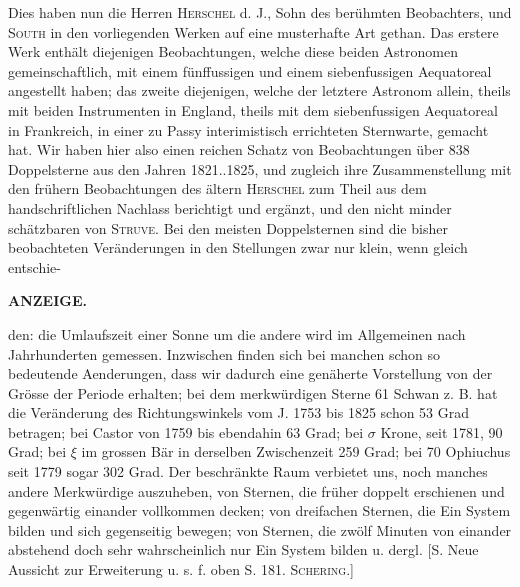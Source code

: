 Dies haben nun die Herren \textsc{Herschel} d. J., Sohn des berühmten Beobachters, und \textsc{South} in den vorliegenden Werken auf eine musterhafte Art gethan. Das erstere Werk enthält diejenigen Beobachtungen, welche diese beiden Astronomen gemeinschaftlich, mit einem fünffussigen und einem siebenfussigen Aequatoreal angestellt haben; das zweite diejenigen, welche der letztere Astronom allein, theils mit beiden Instrumenten in England, theils mit dem siebenfussigen Aequatoreal in Frankreich, in einer zu Passy interimistisch errichteten Sternwarte, gemacht hat. Wir haben hier also einen reichen Schatz von Beobachtungen über 838 Doppelsterne aus den Jahren 1821..1825, und zugleich ihre Zusammenstellung mit den frühern Beobachtungen des ältern \textsc{Herschel} zum Theil aus dem handschriftlichen Nachlass berichtigt und ergänzt, und den nicht minder schätzbaren von \textsc{Struve}. Bei den meisten Doppelsternen sind die bisher beobachteten Veränderungen in den Stellungen zwar nur klein, wenn gleich entschie-
\par\clearpage\thispagestyle{empty}
\fancyhead[L]{}
\noindent{}\parbox[t]{\dimexpr\linewidth-24mm\relax}{\centering\scriptsize\bfseries ANZEIGE.}\makebox[12mm][r]{\large\bfseries }\par\nobreak\medskip\noindent den: die Umlaufszeit einer Sonne um die andere wird im Allgemeinen nach Jahrhunderten gemessen. Inzwischen finden sich bei manchen schon so bedeutende Aenderungen, dass wir dadurch eine genäherte Vorstellung von der Grösse der Periode erhalten; bei dem merkwürdigen Sterne 61 Schwan z. B. hat die Veränderung des Richtungswinkels vom J. 1753 bis 1825 schon 53 Grad betragen; bei Castor von 1759 bis ebendahin 63 Grad; bei $\sigma$ Krone, seit 1781, 90 Grad; bei $\xi$ im grossen Bär in derselben Zwischenzeit 259 Grad; bei 70 Ophiuchus seit 1779 sogar 302 Grad. Der beschränkte Raum verbietet uns, noch manches andere Merkwürdige auszuheben, von Sternen, die früher doppelt erschienen und gegenwärtig einander vollkommen decken; von dreifachen Sternen, die Ein System bilden und sich gegenseitig bewegen; von Sternen, die zwölf Minuten von einander abstehend doch sehr wahrscheinlich nur Ein System bilden u. dergl. [S. Neue Aussicht zur Erweiterung u. s. f. oben S. 181. \textsc{Schering}.]
